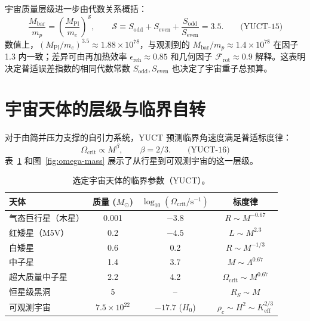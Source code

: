 \documentclass[12pt,a4paper]{article}
\newcommand{\betaf}{\beta}
\newcommand{\Sodd}{S_{\mathrm{odd}}}
\newcommand{\Seven}{S_{\mathrm{even}}}
\newcommand{\Mbar}{M_{\mathrm{bar}}}
\begin{document}
	宇宙质量层级进一步由代数关系概括：
	\[
	\boxed{\frac{\Mbar}{m_p} = \left(\frac{M_{\mathrm{Pl}}}{m_e}\right)^{\mathcal{S}}},\qquad
	\mathcal{S} \equiv \Sodd + \Seven + \frac{\Sodd}{\Seven} = 3.5. \qquad\text{(YUCT-15)}
	\]
	数值上，\((M_{\mathrm{Pl}}/m_e)^{3.5} \approx 1.88\times 10^{78}\)，与观测到的 \(\Mbar/m_p \approx 1.4\times 10^{78}\) 在因子 1.3 内一致；差异可由再加热效率 \(\epsilon_{\mathrm{reh}}\approx 0.85\) 和几何因子 \(\mathcal{F}_{\mathrm{rot}}\approx 0.9\) 解释。这表明决定普适误差指数的相同代数常数 \(S_{\mathrm{odd}}, S_{\mathrm{even}}\) 也决定了宇宙重子总预算。
	
	\section{宇宙天体的层级与临界自转}
	
	对于由简并压力支撑的自引力系统，YUCT 预测临界角速度满足普适标度律：
	\[
	\Omega_{\mathrm{crit}} \propto M^{\betaf},\qquad \betaf = 2/3. \qquad\text{(YUCT-16)}
	\]
	表~\ref{tab:objects} 和图~\ref{fig:omega-mass} 展示了从行星到可观测宇宙的这一层级。
	
	\begin{table}[htbp]
		\centering
		\caption{选定宇宙天体的临界参数（YUCT）。}
		\label{tab:objects}
		\normalsize
		\begin{tabular}{l c c c}
			\toprule
			\textbf{天体} & \textbf{质量 (\(M_\odot\))} & \(\log_{10}(\Omega_{\mathrm{crit}}/\mathrm{s^{-1}})\) & \textbf{标度律} \\
			\midrule
			气态巨行星（木星） & 0.001 & \(-3.8\) & \(R\sim M^{-0.67}\) \\
			红矮星（M5V） & 0.2 & \(-4.5\) & \(L\sim M^{2.3}\) \\
			白矮星 & 0.6 & 0.2 & \(R\sim M^{-1/3}\) \\
			中子星 & 1.4 & 3.7 & \(M\sim\Lambda^{0.67}\) \\
			超大质量中子星 & 2.2 & 4.2 & \(\Omega_{\mathrm{crit}}\sim M^{0.67}\) \\
			恒星级黑洞 & 5 & -- & \(R_S\sim M\) \\
			可观测宇宙 & \(7.5\times10^{22}\) & \(-17.7\) (\(H_0\)) & \(\rho_c\sim H^2\sim K_{\mathrm{eff}}^{2/3}\) \\
			\bottomrule
		\end{tabular}
	\end{table}
	
\end{document}
